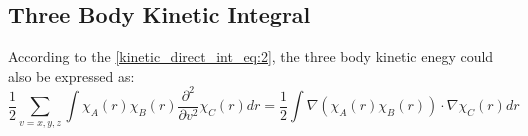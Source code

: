 \begin{comment}


%

\begin{equation}
 \begin{split}
 \left(  \frac{\partial \chi_{A}}{\partial v_{i=k}}|
 \frac{\partial \chi_{B}}{\partial v_{i=k}} \right)  &=  N_{i}(A)N_{i}(B)
\left[ PA_{i}(-2|-1)_{i} + \frac{N_{i}(A)-2}{2 \gamma}(-3|-1)_{i} \right. \\ 
 &+ \left. \frac{N_{i}(B)-1}{2 \gamma}(-2|-2)_{i} \right] \\
&- 2\alpha N_{i}(B)
\left[ PA_{i}(0|-1)_{i} + \frac{N_{i}(A)}{2 \gamma}(-1|-1)_{i} \right. \\ 
 &+ \left. \frac{N_{i}(B)-1}{2 \gamma}(0|-2)_{i} \right] \\ 
&- 2\beta  N_{i}(A)
\left[ PA_{i}(-2|+1)_{i} + \frac{N_{i}(A)-2}{2 \gamma}(-3|+1)_{i} \right. \\ 
 &+ \left. \frac{N_{i}(B)+1}{2 \gamma}(-2|0)_{i} \right] \\  
&+ 4\alpha\beta
\left[ PA_{i}(0|+1)_{i} + \frac{N_{i}(A)}{2 \gamma}(-1|+1)_{i} \right. \\ 
 &+ \left. \frac{N_{i}(B)+1}{2 \gamma}(0|0)_{i} \right] \\
&= PA_{i}
 \left(\frac{\partial (\chi_{A}-\iota_{i})}{\partial v_{i}}|
 \frac{\partial \chi_{B}}{\partial v_{i}} \right) + 
\frac{N_{i}(A)}{2 \gamma}
 \left(\frac{\partial (\chi_{A}-2\iota_{i})}{\partial v_{i}}|
 \frac{\partial \chi_{B}}{\partial v_{i}} \right) \\
&+\frac{N_{i}(B)}{2 \gamma}
 \left(\frac{\partial (\chi_{A}-\iota_{i})}{\partial v_{i}}|
 \frac{\partial(\chi_{B}-\iota_{i})}{\partial v_{i}} \right) \\
&+\Biggl( 
-\frac{2 N_{i}(A)N_{i}(B)}{2\gamma}(-3|-1)_{i} - 
\frac{N_{i}(A)N_{i}(B)}{2\gamma}(-2|-2)_{i} \\
&-
\frac{2 \alpha N_{i}(B)}{2\gamma}(0|-2)_{i} +
\frac{4 \beta N_{i}(A)}{2\gamma}(-3|+1)_{i} \\
&-
\frac{2 \beta N_{i}(A)}{2\gamma}(-2|0)_{i}  +
\frac{4 \alpha\beta}{2\gamma}(0|0)_{i}
\Biggr)
 \end{split}
 \label{OS_kinetic_eq:5}
\end{equation}

\end{comment}

\subsection{Three Body Kinetic Integral}
%
%
%
According to the \ref{kinetic_direct_int_eq:2}, the three body kinetic enegy
could also be expressed as:
\begin{equation}
\frac{1}{2}\sum_{v = x, y, z}\int \chi_{A}(r)\chi_{B}(r)
\frac{\partial^{2}}{\partial v^{2}} \chi_{C}(r) dr
= \frac{1}{2}\int \nabla(\chi_{A}(r)\chi_{B}(r)) \cdot \nabla\chi_{C}(r) dr
 \label{three_body_kinetic_integral_eq:1}
\end{equation}


